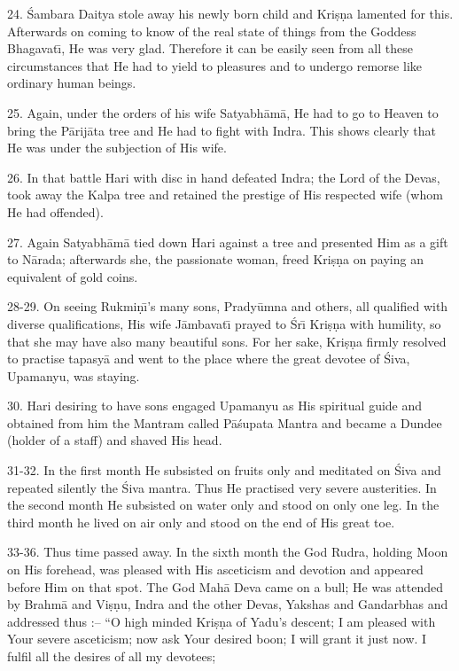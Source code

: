 24. \'Sambara Daitya stole away his newly born child and Kri\d{s}\d{n}a lamented for this. Afterwards on coming to know of the real state of things from the Goddess Bhagavat\={\i}, He was very glad. Therefore it can be easily seen from all these circumstances that He had to yield to pleasures and to undergo remorse like ordinary human beings.

25. Again, under the orders of his wife Satyabh\=am\=a, He had to go to Heaven to bring the P\=arij\=ata tree and He had to fight with Indra. This shows clearly that He was under the subjection of His wife.

26. In that battle Hari with disc in hand defeated Indra; the Lord of the Devas, took away the Kalpa tree and retained the prestige of His respected wife (whom He had offended).

27. Again Satyabh\=am\=a tied down Hari against a tree and presented Him as a gift to N\=arada; afterwards she, the passionate woman, freed Kri\d{s}\d{n}a on paying an equivalent of gold coins.

28-29. On seeing Rukmi\d{n}\={\i}'s many sons, Prady\=umna and others, all qualified with diverse qualifications, His wife J\=ambavat\={\i} prayed to \'Sr\={\i} Kri\d{s}\d{n}a with humility, so that she may have also many beautiful sons. For her sake, Kri\d{s}\d{n}a firmly resolved to practise tapasy\=a and went to the place where the great devotee of \'Siva, Upamanyu, was staying.

30. Hari desiring to have sons engaged Upamanyu as His spiritual guide and obtained from him the Mantram called P\=a\'supata Mantra and became a Dundee (holder of a staff) and shaved His head.

31-32. In the first month He subsisted on fruits only and meditated on \'Siva and repeated silently the \'Siva mantra. Thus He practised very severe austerities. In the second month He subsisted on water only and stood on only one leg. In the third month he lived on air only and stood on the end of His great toe.

33-36. Thus time passed away. In the sixth month the God Rudra, holding Moon on His forehead, was pleased with His asceticism and devotion and appeared before Him on that spot. The God Mah\=a Deva came on a bull; He was attended by Brahm\=a and Vi\d{s}\d{n}u, Indra and the other Devas, Yakshas and Gandarbhas and addressed thus :-- ``O high minded Kri\d{s}\d{n}a of Yadu's descent; I am pleased with Your severe asceticism; now ask Your desired boon; I will grant it just now. I fulfil all the desires of all my devotees;


